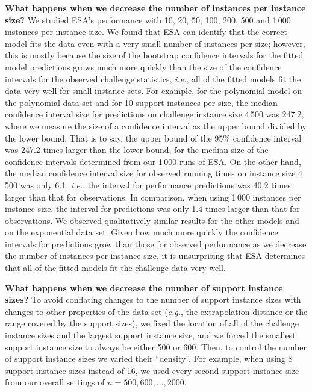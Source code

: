 \documentclass[aic]{iosart2x}
\newcommand{\eg}{\emph{e.g.}}
\newcommand{\ie}{\emph{i.e.}}
\begin{document}
\textbf{What happens when we decrease the number of instances per instance size?}
We studied ESA's performance with 10, 20, 50, 100, 200, 500 and 1\,000 instances per instance size.
We found that ESA can identify that the correct model fits the data even with a very small number of instances per size; however, this is mostly because the size of the bootstrap confidence intervals for the fitted model predictions grows much more quickly than the size of the confidence intervals for the observed challenge statistics, \ie{}, all of the fitted models fit the data very well for small instance sets. 
For example, for the polynomial model on the polynomial data set and for 10 support instances per size, the median confidence interval size for predictions on challenge instance size 4\,500 was 247.2, where we measure the size of a confidence interval as the upper bound divided by the lower bound. That is to say, the upper bound of the 95\% confidence interval was 247.2 times larger than the lower bound, for the median size of the confidence intervals determined  from our 1\,000 runs of ESA. 
On the other hand, the median confidence interval size for observed running times on instance size 4\,500 was only 6.1, \ie{}, the interval for performance predictions was 40.2 times larger than that for observations.
In comparison, when using 1\,000 instances per instance size, the interval for predictions was only 1.4 times larger than that for observations. 
We observed qualitatively similar results for the other models and on the exponential data set. 
Given how much more quickly the confidence intervals for predictions grow than those for observed performance as we decrease the number of instances per instance size, it is unsurprising that ESA determines that all of the fitted models fit the challenge data very well.

\textbf{What happens when we decrease the number of support instance sizes?}
To avoid conflating changes to the number of support instance sizes with changes to other properties of the data set (\eg{}, the extrapolation distance or the range covered by the support sizes), we fixed the location of all of the challenge instance sizes and the largest support instance size, and we forced the smallest support instance size to always be either 500 or 600. 
Then, to control the number of support instance sizes we varied their ``density''. 
For example, when using 8 support instance sizes instead of 16, we used every second support instance size from our overall settings of $n=500, 600, ..., 2000$.
\end{document}
